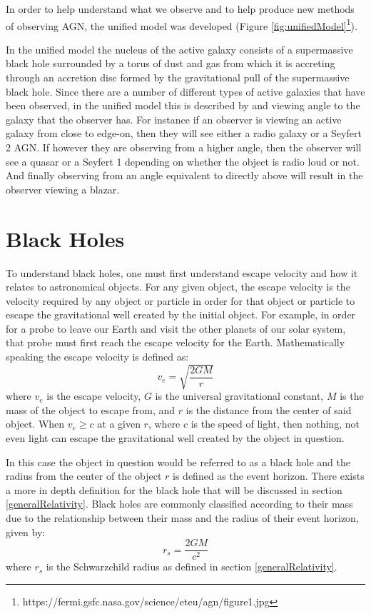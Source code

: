 \documentclass[12pt, oneside]{smuthesis}
\begin{document}
In order to help understand what we observe and to help produce new methods of observing AGN, the unified model was developed (Figure \ref{fig:unifiedModel}\footnote{https://fermi.gsfc.nasa.gov/science/eteu/agn/figure1.jpg}). 

In the unified model the nucleus of the active galaxy consists of a supermassive black hole surrounded by a torus of dust and gas from which it is accreting through an accretion disc formed by the gravitational pull of the supermassive black hole. Since there are a number of different types of active galaxies that have been observed, in the unified model this is described by and viewing angle to the galaxy that the observer has. For instance if an observer is viewing an active galaxy from close to edge-on, then they will see either a radio galaxy or a Seyfert 2 AGN. If however they are observing from a higher angle, then the observer will see a quasar or a Seyfert 1 depending on whether the object is radio loud or not. And finally observing from an angle equivalent to directly above will result in the observer viewing a blazar.

\section{\sc Black Holes} \label{blackHole}

To understand black holes, one must first understand escape velocity and how it relates to astronomical objects. For any given object, the escape velocity is the velocity required by any object or particle in order for that object or particle to escape the gravitational well created by the initial object. For example, in order for a probe to leave our Earth and visit the other planets of our solar system, that probe must first reach the escape velocity for the Earth. Mathematically speaking the escape velocity is defined as:
\begin{equation}
v_{e} = \sqrt{\frac{2GM}{r}}
\end{equation}
where $v_{e}$ is the escape velocity, $G$ is the universal gravitational constant, $M$ is the mass of the object to escape from, and $r$ is the distance from the center of said object. When $v_{e} \geq c$ at a given $r$, where $c$ is the speed of light, then nothing, not even light can escape the gravitational well created by the object in question.

In this case the object in question would be referred to as a black hole and the radius from the center of the object $r$ is defined as the event horizon. There exists a more in depth definition for the black hole that will be discussed in section \ref{generalRelativity}. Black holes are commonly classified according to their mass due to the relationship between their mass and the radius of their event horizon, given by:
\begin{equation}
r_{s} = \frac{2GM}{c^{2}}
\end{equation}
where $r_{s}$ is the Schwarzchild radius as defined in section \ref{generalRelativity}.
\end{document}
